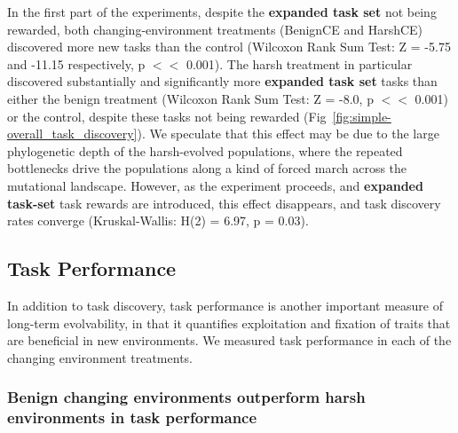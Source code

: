 \documentclass[10pt,letterpaper,final]{article}
\begin{document}
In the first part of the experiments, despite the \textbf{expanded task set} not being rewarded, both changing-environment treatments (BenignCE and HarshCE) discovered more new tasks than the control (Wilcoxon Rank Sum Test: Z = -5.75 and -11.15 respectively, p $<<$ 0.001). The harsh treatment in particular discovered substantially and significantly more \textbf{expanded task set} tasks than either the benign treatment (Wilcoxon Rank Sum Test: Z = -8.0, p $<<$ 0.001) or the control, despite these tasks not being rewarded (Fig~\ref{fig:simple-overall_task_discovery}). We speculate that this effect may be due to the large phylogenetic depth of the harsh-evolved populations, where the repeated bottlenecks drive the populations along a kind of forced march across the mutational landscape. However, as the experiment proceeds, and \textbf{expanded task-set} task rewards are introduced, this effect disappears, and task discovery rates converge (Kruskal-Wallis: H(2) = 6.97, p = 0.03).

\subsection*{Task Performance}
In addition to task discovery, task performance is another important measure of long-term evolvability, in that it quantifies exploitation and fixation of traits that are beneficial in new environments. We measured task performance in each of the changing environment treatments.

\subsubsection*{Benign changing environments outperform harsh environments in task performance}
\end{document}
